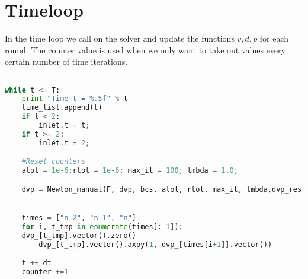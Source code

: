 \section{Timeloop}
In the time loop we call on the solver and update the functions $ v,d,p$ for each round. The counter value is used when we only want to take out values every certain number of time iterations.

\begin{lstlisting}[language=Python, basicstyle=\small]

while t <= T:
    print "Time t = %.5f" % t
    time_list.append(t)
    if t < 2:
        inlet.t = t;
    if t >= 2:
        inlet.t = 2;

    #Reset counters
    atol = 1e-6;rtol = 1e-6; max_it = 100; lmbda = 1.0;

    dvp = Newton_manual(F, dvp, bcs, atol, rtol, max_it, lmbda,dvp_res,VVQ)


    times = ["n-2", "n-1", "n"]
    for i, t_tmp in enumerate(times[:-1]):
   	dvp_[t_tmp].vector().zero()
    	dvp_[t_tmp].vector().axpy(1, dvp_[times[i+1]].vector())

    t += dt
    counter +=1
\end{lstlisting}


	